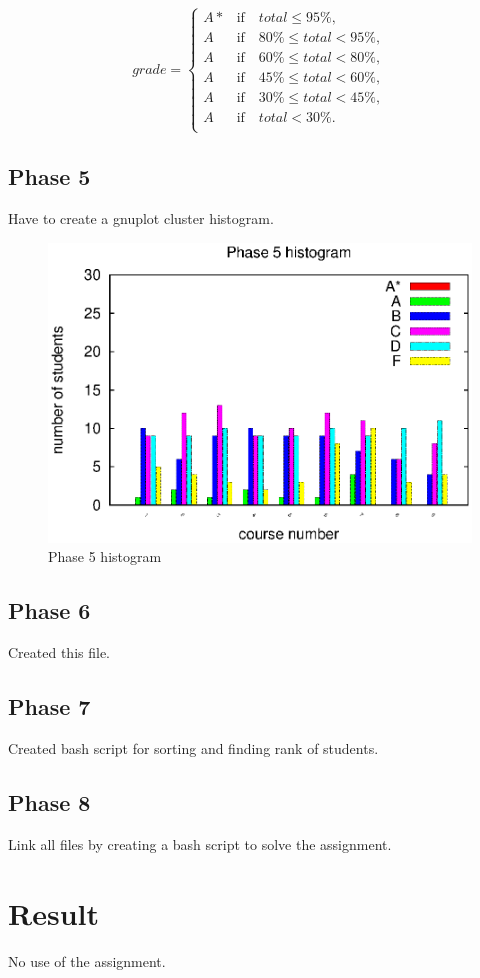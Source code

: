 \documentclass{article}
\begin{document}
\begin{equation*}
	\label{eq:grade}
		grade = 
		\begin{cases}
			A* & \text{if} \quad total \leq 95\%,\\
			A & \text{if} \quad 80\% \leq total < 95\%,\\
			A & \text{if} \quad 60\% \leq total < 80\%,\\
			A & \text{if} \quad 45\% \leq total < 60\%,\\
			A & \text{if} \quad 30\% \leq total < 45\%,\\
			A & \text{if} \quad total < 30\%.\\
		\end{cases}
\end{equation*}

\subsection{Phase 5}
Have to create a gnuplot cluster histogram.

\begin{figure}[!htpb]
	\label{fig:p5}
	\begin{center}
		\includegraphics[width=0.6\columnwidth,height=0.5\columnwidth,keepaspectratio]{phase5.eps}
	\end{center}
	\caption{Phase 5 histogram}
\end{figure}

\subsection{Phase 6}
Created this file.

\subsection{Phase 7}
Created bash script for sorting and finding rank of students.

\subsection{Phase 8}
Link all files by creating a bash script to solve the assignment.

\section{Result}
No use of the assignment.


\end{document}
